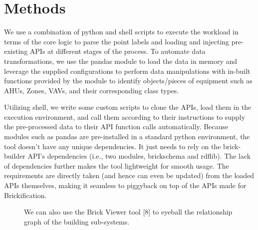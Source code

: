 \documentclass[twocolumn, switch]{article} %
\begin{document}
\section{Methods}
We use a combination of python and shell scripts to execute the workload in terms of the core logic to parse the point labels and loading and injecting pre-existing APIs at different stages of the process.  
To automate data transformations, we use the pandas module to load the data in memory and leverage the supplied configurations to perform data manipulations with in-built functions provided by the module to identify objects/pieces of equipment such as AHUs, Zones, VAVs, and their corresponding class types. 

	Utilizing shell, we write some custom scripts to clone the APIs, load them in the execution environment, and call them according to their instructions to supply the pre-processed data to their API function calls automatically.  
	Because modules such as pandas are pre-installed in a standard python environment, the tool doesn’t have any unique dependencies. It just needs to rely on the brick-builder API’s dependencies (i.e., two modules, brickschema and rdflib). The lack of dependencies further makes the tool lightweight for smooth usage. The requirements are directly taken (and hence can even be updated) from the loaded APIs themselves, making it seamless to piggyback on top of the APIs made for Brickification.

\begin{figure}[H]
  \centering
  \caption{We can also use the Brick Viewer tool [8] to eyeball the relationship graph of the building sub-systems.}
  \label{fig:fig3}
\end{figure}
\end{document}
